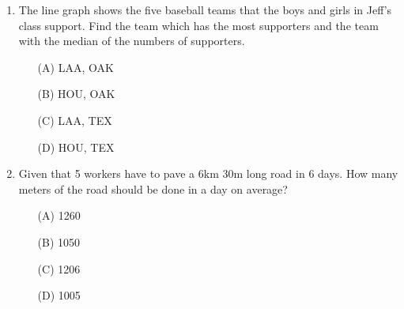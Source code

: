 \documentclass[11pt]{scrartcl}
\begin{document}
\begin{enumerate}
        \item The line graph shows the five baseball teams that the boys and girls in Jeff's class support. Find the team which has the most supporters and the team with the median of the numbers of supporters.

    \begin{center}
    \end{center}

    \begin{enumerate}
        \item[(A)] LAA, OAK
        \item[(B)] HOU, OAK
        \item[(C)] LAA, TEX
        \item[(D)] HOU, TEX
    \end{enumerate}
    \vspace{4\baselineskip}


    \item Given that 5 workers have to pave a 6km 30m long road in 6 days. How many meters of the road should be done in a day on average?
    \begin{enumerate}
        \item[(A)] 1260
        \item[(B)] 1050
        \item[(C)] 1206
        \item[(D)] 1005
    \end{enumerate}
    \vspace{4\baselineskip}



\end{enumerate}
\end{document}
